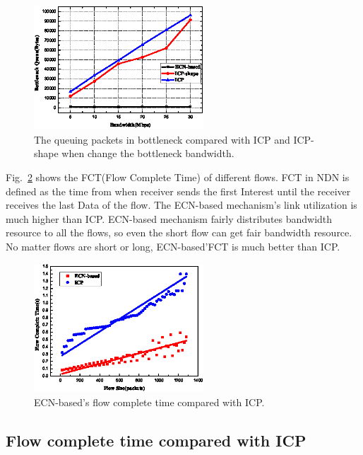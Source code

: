 \begin{figure}[t]
	\centering
	\includegraphics[width=2.5in]{queu-pic-cut.eps}
	\caption{The queuing packets in bottleneck compared with ICP and ICP-shape when change the bottleneck bandwidth.}
	\label{fig-queue}
\end{figure}

Fig.~\ref{fig-fct} shows the FCT(Flow Complete Time) of different flows. FCT in NDN is defined as the time from when receiver sends the first Interest until the receiver receives the last Data of the flow. The ECN-based mechanism's link utilization is much higher than ICP. ECN-based mechanism fairly distributes bandwidth resource to all the flows, so even the short flow can get fair bandwidth resource. No matter flows are short or long, ECN-based'FCT is much better than ICP.

\begin{figure}[t]
	\centering
	\includegraphics[width=2.5in]{fct-cut.eps}
	\caption{ECN-based's flow complete time compared with ICP.}
	\label{fig-fct}
\end{figure}

\subsection{Flow complete time compared with ICP}

